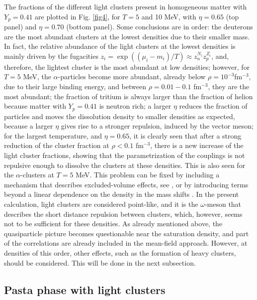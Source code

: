 \documentclass[aps,prc,nofootinbib,twocolumn,showpacs]{revtex4-1}
\begin{document}
The fractions of the different light clusters present in homogeneous matter with
$Y_p=0.41$  are plotted in Fig. \ref{fig4},
for $T=5$ and 10 MeV, with $\eta=0.65$ (top panel)  and $\eta=0.70$
(bottom panel). Some conclusions are in order: the deuterons
are the most abundant clusters at the lowest densities due to
their smaller mass.  In fact, the relative abundance of the light
clusters at the lowest densities is mainly
driven by the fugacities $z_{i} = \exp((\mu_{i}-m_{i})/T) \approx
z_{n}^{N_{i}}z_{p}^{Z_{i}}$, and, therefore, the lightest cluster is
the most abundant at low densities; however, for $T=5$ MeV, the $\alpha$-particles become
more abundant, already below  $\rho=10^{-3}$fm$^{-3}$, due to their
large binding energy, and between $\rho=0.01-0.1$ fm$^{-3}$, they are the most abundant; the fraction of tritium is always
larger than the fraction of helion because matter with $Y_p=0.41$ is neutron rich; a larger $\eta$ reduces the
fraction of particles and moves the dissolution density to smaller
densities as expected, because a larger $\eta$ gives rise to a stronger repulsion,
induced by the vector meson; for the largest temperature, and
$\eta=0.65$, it is clearly seen that after a strong reduction of the
cluster fraction at $\rho<0.1$ fm$^{-3}$, there is a new increase  of the light
cluster fractions,
showing that the parametrization of the couplings is not repulsive
enough to dissolve the clusters at these densities. 
This is also seen for the $\alpha$-clusters at $T=5$ MeV. This problem  can be fixed by
including a mechanism that  describes excluded-volume effects, see
\cite{typel2016}, or by  introducing terms beyond a linear
dependence on the density  in the mass shifts \cite{typel10}. In the present calculation, light clusters are
considered point-like, and it is the $\omega$-meson that describes the
short distance repulsion between clusters, which, however, seems not
to be sufficient for these densities. As already mentioned above, the quasiparticle picture becomes questionable near the saturation density, and part of the correlations are already included in the mean-field approach. However, at densities of this order, other effects,
such as the formation of heavy clusters,
should be considered. This will be done in the next subsection.




\subsection{Pasta phase with light clusters}
\end{document}
